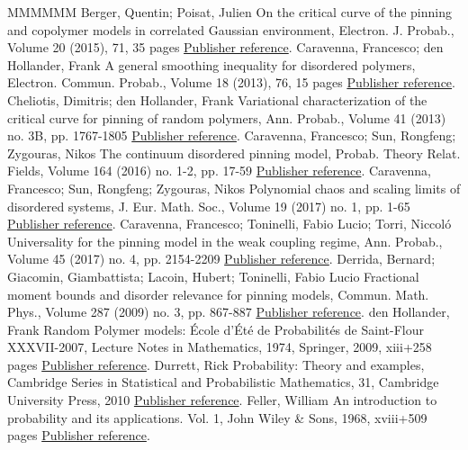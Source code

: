 \documentclass[11pt]{article}
\theoremstyle{definition}
\numberwithin{equation}{section}
\numberwithin{figure}{section}
\numberwithin{table}{section}
\begin{document}
\begin{thebibliography}{MMMMMM}
 Berger, Quentin; Poisat, Julien On the critical curve of the pinning and copolymer models in correlated Gaussian environment, Electron. J. Probab., Volume 20 (2015), 71, 35 pages \href{https://ahl.centre-mersenne.org/item/AHL_2019__2__281_0/#BP15}{Publisher reference}.
 Caravenna, Francesco; den Hollander, Frank A general smoothing inequality for disordered polymers, Electron. Commun. Probab., Volume 18 (2013), 76, 15 pages \href{https://ahl.centre-mersenne.org/item/AHL_2019__2__281_0/#CadH13}{Publisher reference}.
 Cheliotis, Dimitris; den Hollander, Frank Variational characterization of the critical curve for pinning of random polymers, Ann. Probab., Volume 41 (2013) no. 3B, pp. 1767-1805 \href{https://ahl.centre-mersenne.org/item/AHL_2019__2__281_0/#CdH13}{Publisher reference}.
 Caravenna, Francesco; Sun, Rongfeng; Zygouras, Nikos The continuum disordered pinning model, Probab. Theory Relat. Fields, Volume 164 (2016) no. 1-2, pp. 17-59 \href{https://ahl.centre-mersenne.org/item/AHL_2019__2__281_0/#CSZ16}{Publisher reference}.
 Caravenna, Francesco; Sun, Rongfeng; Zygouras, Nikos Polynomial chaos and scaling limits of disordered systems, J. Eur. Math. Soc., Volume 19 (2017) no. 1, pp. 1-65 \href{https://ahl.centre-mersenne.org/item/AHL_2019__2__281_0/#CSZ16+}{Publisher reference}.
 Caravenna, Francesco; Toninelli, Fabio Lucio; Torri, Niccoló Universality for the pinning model in the weak coupling regime, Ann. Probab., Volume 45 (2017) no. 4, pp. 2154-2209 \href{https://ahl.centre-mersenne.org/item/AHL_2019__2__281_0/#CTT16+}{Publisher reference}.
 Derrida, Bernard; Giacomin, Giambattista; Lacoin, Hubert; Toninelli, Fabio Lucio Fractional moment bounds and disorder relevance for pinning models, Commun. Math. Phys., Volume 287 (2009) no. 3, pp. 867-887 \href{https://ahl.centre-mersenne.org/item/AHL_2019__2__281_0/#DGLT09}{Publisher reference}.
 den Hollander, Frank Random Polymer models: École d’Été de Probabilités de Saint-Flour XXXVII-2007, Lecture Notes in Mathematics, 1974, Springer, 2009, xiii+258 pages \href{https://ahl.centre-mersenne.org/item/AHL_2019__2__281_0/#dH09}{Publisher reference}.
 Durrett, Rick Probability: Theory and examples, Cambridge Series in Statistical and Probabilistic Mathematics, 31, Cambridge University Press, 2010 \href{https://ahl.centre-mersenne.org/item/AHL_2019__2__281_0/#Du10}{Publisher reference}.
 Feller, William An introduction to probability and its applications. Vol. 1, John Wiley \& Sons, 1968, xviii+509 pages \href{https://ahl.centre-mersenne.org/item/AHL_2019__2__281_0/#Feller68}{Publisher reference}.

\end{thebibliography}
\end{document}
